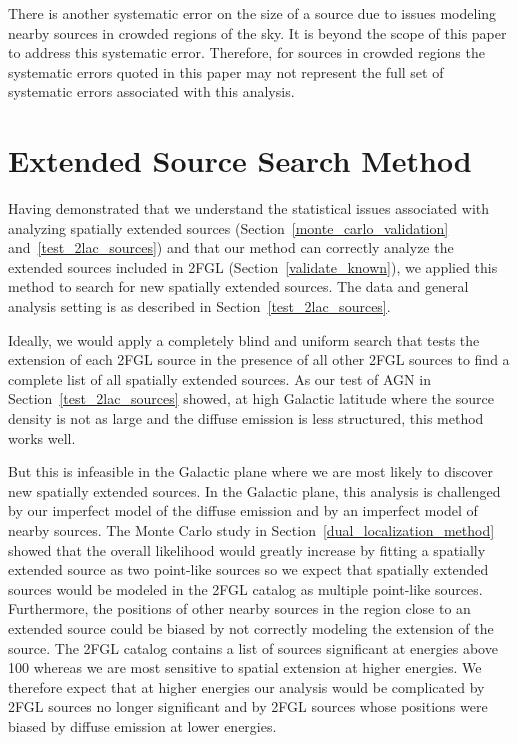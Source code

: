 \documentclass[12pt,preprint]{aastex}
\newcommand{\mev}{\text{MeV}\xspace}
\newcommand{\gev}{\text{GeV}\xspace}
\begin{document}
There is another systematic error on the size of a source due to issues
modeling nearby sources in crowded regions of the sky. It is beyond the
scope of this paper to address this systematic error. Therefore, 
for sources in crowded regions the systematic
errors quoted in this paper 
may not represent the full set of systematic errors associated with this analysis.

\section{Extended Source Search Method}
\label{extended_source_search_method}


Having demonstrated that we understand the statistical
issues associated with analyzing spatially extended sources
(Section~\ref{monte_carlo_validation} and~\ref{test_2lac_sources}) and
that our method can correctly analyze the extended sources included in
2FGL (Section~\ref{validate_known}), we applied this method to search for
new spatially extended \gev sources.
The data and general analysis setting is as described in Section~\ref{test_2lac_sources}.

Ideally, we would apply a completely blind and uniform search that
tests the extension of each 2FGL source in the presence of all other
2FGL sources to find a complete list of all spatially extended sources.
As our test of AGN in Section~\ref{test_2lac_sources} showed, at high
Galactic latitude where the source density is not as large and the
diffuse emission is less structured, this method works well.

But this is infeasible in the Galactic plane where we 
are most likely to discover new spatially extended sources.  In the Galactic plane,
this analysis is challenged by our imperfect model of the diffuse
emission and by an imperfect model of nearby sources.  The Monte Carlo
study in Section~\ref{dual_localization_method}
showed that the overall likelihood would greatly increase by fitting
a spatially extended source as two point-like sources so we expect
that spatially extended sources would be modeled in the 2FGL catalog as
multiple point-like sources. Furthermore, the positions of other nearby sources
in the region close to an extended source could be biased by not correctly
modeling the extension of the source.  The 2FGL catalog contains a
list of sources significant at energies above 100 \mev whereas we are
most sensitive to spatial extension at higher energies.
We therefore expect that at higher energies our analysis would be complicated
by 2FGL sources no longer significant and by 2FGL
sources whose positions were biased by diffuse emission at lower energies.
\end{document}
